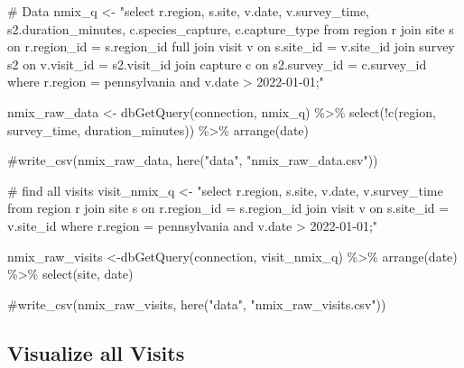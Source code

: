 \documentclass[
  letterpaper,
  DIV=11,
  numbers=noendperiod]{scrartcl}
\newenvironment{Shaded}{\begin{snugshade}}{\end{snugshade}}
\newcommand{\CommentTok}[1]{\textcolor[rgb]{0.37,0.37,0.37}{#1}}
\newcommand{\FunctionTok}[1]{\textcolor[rgb]{0.28,0.35,0.67}{#1}}
\newcommand{\NormalTok}[1]{\textcolor[rgb]{0.00,0.23,0.31}{#1}}
\newcommand{\OtherTok}[1]{\textcolor[rgb]{0.00,0.23,0.31}{#1}}
\newcommand{\SpecialCharTok}[1]{\textcolor[rgb]{0.37,0.37,0.37}{#1}}
\newcommand{\StringTok}[1]{\textcolor[rgb]{0.13,0.47,0.30}{#1}}
\begin{document}
\begin{Shaded}
\begin{Highlighting}[]
\CommentTok{\# Data}
\NormalTok{nmix\_q }\OtherTok{\textless{}{-}} \StringTok{"select r.region, s.site, v.date, v.survey\_time, s2.duration\_minutes, }
\StringTok{          c.species\_capture, c.capture\_type}
\StringTok{          from region r}
\StringTok{          join site s on r.region\_id = s.region\_id }
\StringTok{          full join visit v on s.site\_id = v.site\_id }
\StringTok{          join survey s2 on v.visit\_id = s2.visit\_id }
\StringTok{          join capture c on s2.survey\_id = c.survey\_id}
\StringTok{          where r.region = \textquotesingle{}pennsylvania\textquotesingle{}}
\StringTok{          and v.date \textgreater{} \textquotesingle{}2022{-}01{-}01\textquotesingle{};"}

\NormalTok{nmix\_raw\_data }\OtherTok{\textless{}{-}} \FunctionTok{dbGetQuery}\NormalTok{(connection, nmix\_q) }\SpecialCharTok{\%\textgreater{}\%} 
  \FunctionTok{select}\NormalTok{(}\SpecialCharTok{!}\FunctionTok{c}\NormalTok{(region, survey\_time, duration\_minutes)) }\SpecialCharTok{\%\textgreater{}\%} 
  \FunctionTok{arrange}\NormalTok{(date) }

\CommentTok{\#write\_csv(nmix\_raw\_data, here("data", "nmix\_raw\_data.csv"))}



\CommentTok{\# find all visits}
\NormalTok{visit\_nmix\_q }\OtherTok{\textless{}{-}} \StringTok{"select r.region, s.site, v.date, v.survey\_time}
\StringTok{                from region r}
\StringTok{                join site s on r.region\_id = s.region\_id }
\StringTok{                join visit v on s.site\_id = v.site\_id }
\StringTok{                where r.region = \textquotesingle{}pennsylvania\textquotesingle{}}
\StringTok{                and v.date \textgreater{} \textquotesingle{}2022{-}01{-}01\textquotesingle{};"}

\NormalTok{nmix\_raw\_visits }\OtherTok{\textless{}{-}}\FunctionTok{dbGetQuery}\NormalTok{(connection, visit\_nmix\_q) }\SpecialCharTok{\%\textgreater{}\%} 
  \FunctionTok{arrange}\NormalTok{(date) }\SpecialCharTok{\%\textgreater{}\%} 
  \FunctionTok{select}\NormalTok{(site, date)}


\CommentTok{\#write\_csv(nmix\_raw\_visits, here("data", "nmix\_raw\_visits.csv"))}
\end{Highlighting}
\end{Shaded}

\hypertarget{visualize-all-visits}{%
\subsection{Visualize all Visits}\label{visualize-all-visits}}
\end{document}
